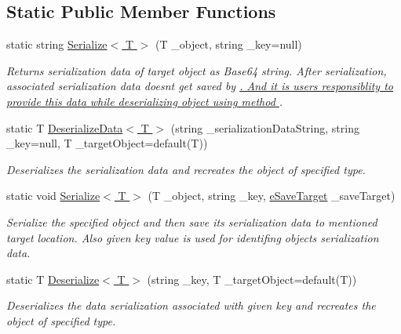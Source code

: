 \subsection*{Static Public Member Functions}
\begin{DoxyCompactItemize}
\item 
static string \hyperlink{class_r_s_manager_a8f9e0f48f1659ab548f840b344302815}{Serialize$<$ T $>$} (T \+\_\+object, string \+\_\+key=null)
\begin{DoxyCompactList}\small\item\em Returns serialization data of target object as Base64 string. After serialization, associated serialization data doesn\textquotesingle{}t get saved by \hyperlink{class_r_s_manager}{. And it is user\textquotesingle{}s responsiblity to provide this data while deserializing object using method } . \end{DoxyCompactList}\item 
static T \hyperlink{class_r_s_manager_aacb8fb568297e83048ffdee62934c5a4}{Deserialize\+Data$<$ T $>$} (string \+\_\+serialization\+Data\+String, string \+\_\+key=null, T \+\_\+target\+Object=default(T))
\begin{DoxyCompactList}\small\item\em Deserializes the serialization data and recreates the object of specified type. \end{DoxyCompactList}\item 
static void \hyperlink{class_r_s_manager_a895490662c28260917e8d41029a584e1}{Serialize$<$ T $>$} (T \+\_\+object, string \+\_\+key, \hyperlink{namespace_voxel_busters_1_1_runtime_serialization_aacaa3008b2cb441fbe4708df854019bf}{e\+Save\+Target} \+\_\+save\+Target)
\begin{DoxyCompactList}\small\item\em Serialize the specified object and then save its serialization data to mentioned target location. Also given key value is used for identifing objects serialization data. \end{DoxyCompactList}\item 
static T \hyperlink{class_r_s_manager_a331c1537211afdc7720b6d82fd77c435}{Deserialize$<$ T $>$} (string \+\_\+key, T \+\_\+target\+Object=default(T))
\begin{DoxyCompactList}\small\item\em Deserializes the data serialization associated with given key and recreates the object of specified type. \end{DoxyCompactList}\item 

\end{DoxyCompactItemize}
